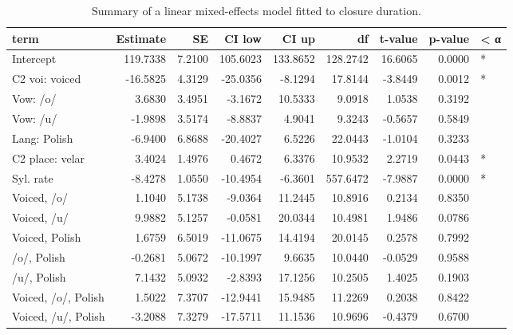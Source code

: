 \documentclass[preprint]{JASAnew}
\begin{document}
\begin{table}

\caption{\label{tab:clo-table}Summary of a linear mixed-effects model fitted to closure duration.}
\centering
\begin{tabular}[t]{lrrrrrrrl}
\toprule
term & Estimate & SE & CI low & CI up & df & t-value & p-value & < α\\
\midrule
Intercept & 119.7338 & 7.2100 & 105.6023 & 133.8652 & 128.2742 & 16.6065 & 0.0000 & *\\
C2 voi: voiced & -16.5825 & 4.3129 & -25.0356 & -8.1294 & 17.8144 & -3.8449 & 0.0012 & *\\
Vow: /o/ & 3.6830 & 3.4951 & -3.1672 & 10.5333 & 9.0918 & 1.0538 & 0.3192 & \\
Vow: /u/ & -1.9898 & 3.5174 & -8.8837 & 4.9041 & 9.3243 & -0.5657 & 0.5849 & \\
Lang: Polish & -6.9400 & 6.8688 & -20.4027 & 6.5226 & 22.0443 & -1.0104 & 0.3233 & \\
\addlinespace
C2 place: velar & 3.4024 & 1.4976 & 0.4672 & 6.3376 & 10.9532 & 2.2719 & 0.0443 & *\\
Syl. rate & -8.4278 & 1.0550 & -10.4954 & -6.3601 & 557.6472 & -7.9887 & 0.0000 & *\\
Voiced, /o/ & 1.1040 & 5.1738 & -9.0364 & 11.2445 & 10.8916 & 0.2134 & 0.8350 & \\
Voiced, /u/ & 9.9882 & 5.1257 & -0.0581 & 20.0344 & 10.4981 & 1.9486 & 0.0786 & \\
Voiced, Polish & 1.6759 & 6.5019 & -11.0675 & 14.4194 & 20.0145 & 0.2578 & 0.7992 & \\
\addlinespace
/o/, Polish & -0.2681 & 5.0672 & -10.1997 & 9.6635 & 10.0440 & -0.0529 & 0.9588 & \\
/u/, Polish & 7.1432 & 5.0932 & -2.8393 & 17.1256 & 10.2505 & 1.4025 & 0.1903 & \\
Voiced, /o/, Polish & 1.5022 & 7.3707 & -12.9441 & 15.9485 & 11.2269 & 0.2038 & 0.8422 & \\
Voiced, /u/, Polish & -3.2088 & 7.3279 & -17.5711 & 11.1536 & 10.9696 & -0.4379 & 0.6700 & \\
\bottomrule
\end{tabular}
\end{table}
\end{document}
